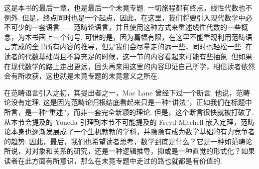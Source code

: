 



这是本书的最后一章，也是最后一个未竟专题. 一切旅程都有终点，线性代数也不例外. 但是，终点同时也是一个起点，因此，在这里，我们将要引入现代数学中必不可少的一套语言——范畴论语言，并且使用这种方式来重述线性代数的一些概念，为本书画上一个句号. 可惜的是，因为篇幅有限，在这里不能重现利用范畴语言完成的全书所有内容的推导，但是我们会尽量走的远一些，同时也轻松一些. 在读者的代数基础尚且不算充足的时候，这一节的内容看起来可能有些抽象. 但如果在现代数学的路上走出更远，回头再来用这里的内容印证自己所学，相信读者依然会有所收获，这也就是未竟专题的未竟意义之所在.

在范畴语言引入之初，其提出者之一，Mac Lane 曾经下过一个断言. 他说，范畴论没有定理. 这是因为范畴论归根结底看起来只是一种“讲法”，正如我们在标题中所言，是一种“重述”，而非一套完全新颖的理论. 但是，这个断言很快就被打破了. 从本节会提及的 Yoneda 引理到本节不可能提及的 Freyd-Mitchell 嵌入定理，范畴论本身也逐渐发展成了一个生机勃勃的学科，并隐隐有成为数学基础的有力竞争者的趋势. 因此，最后，我们也希望读者思考，数学到底是什么？它是一种如范畴论所说，对对象和关系的研究，还是一种逻辑推导，抑或是一种直觉的形式化？如果读者在此方面有所意识，那么在未竟专题中走过的路也就都是有价值的.

